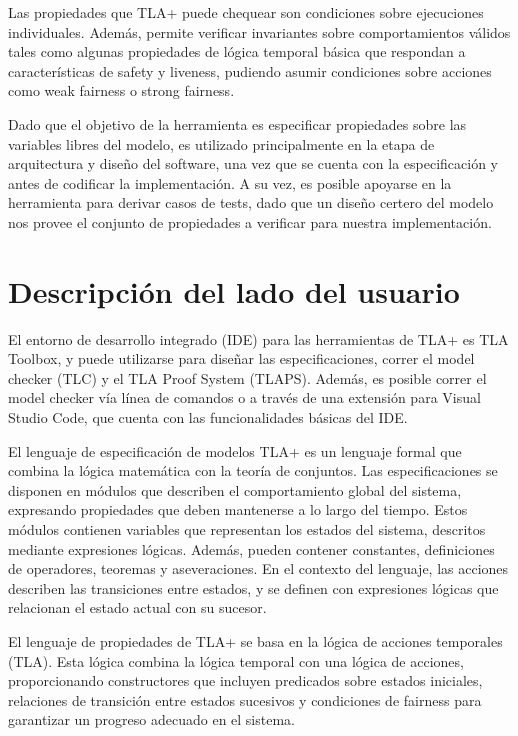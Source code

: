\documentclass[runningheads]{llncs}
\begin{document}
Las propiedades que TLA+ puede chequear son condiciones sobre ejecuciones individuales. Además, permite verificar invariantes sobre comportamientos válidos tales como algunas propiedades de lógica temporal básica que respondan a características de safety y liveness, pudiendo asumir condiciones sobre acciones como weak fairness o strong fairness.

Dado que el objetivo de la herramienta es especificar propiedades sobre las variables libres del modelo, es utilizado principalmente en la etapa de arquitectura y diseño del software, una vez que se cuenta con la especificación y antes de codificar la implementación. A su vez, es posible apoyarse en la herramienta para derivar casos de tests, dado que un diseño certero del modelo nos provee el conjunto de propiedades a verificar para nuestra implementación.

\section{Descripción del lado del usuario}
El entorno de desarrollo integrado (IDE) para las herramientas de TLA+ es TLA Toolbox, y puede utilizarse para diseñar las especificaciones, correr el model checker (TLC) y el TLA Proof System (TLAPS). Además, es posible correr el model checker vía línea de comandos o a través de una extensión para Visual Studio Code, que cuenta con las funcionalidades básicas del IDE.

El lenguaje de especificación de modelos TLA+ es un lenguaje formal que combina la lógica matemática con la teoría de conjuntos. Las especificaciones se disponen en módulos que describen el comportamiento global del sistema, expresando propiedades que deben mantenerse a lo largo del tiempo. Estos módulos contienen variables que representan los estados del sistema, descritos mediante expresiones lógicas. Además, pueden contener constantes, definiciones de operadores, teoremas y aseveraciones. En el contexto del lenguaje, las acciones describen las transiciones entre estados, y se definen con expresiones lógicas que relacionan el estado actual con su sucesor.

El lenguaje de propiedades de TLA+ se basa en la lógica de acciones temporales (TLA). Esta lógica combina la lógica temporal con una lógica de acciones, proporcionando constructores que incluyen predicados sobre estados iniciales, relaciones de transición entre estados sucesivos y condiciones de fairness para garantizar un progreso adecuado en el sistema.
\end{document}
